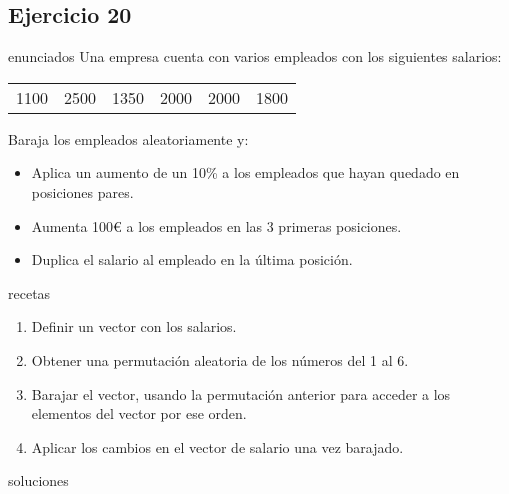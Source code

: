 \subsection{Ejercicio 20}
\def\parte{enunciados}
\ifx\capitulo\parte
Una empresa cuenta con varios empleados con los siguientes salarios:
\begin{center}
  \begin{tabular}[h]{cccccc}
    1100&2500&1350&2000&2000&1800
  \end{tabular}
\end{center}

Baraja los empleados aleatoriamente y:
\begin{itemize}
\item Aplica un aumento de un 10\% a los empleados que hayan quedado en posiciones pares.
\item Aumenta 100€ a los empleados en las 3 primeras posiciones.
\item Duplica el salario al empleado en la última posición.
\end{itemize}
\fi

\def\parte{recetas}
\ifx\capitulo\parte
\begin{enumerate}
\item Definir un vector con los salarios.
\item Obtener una permutación aleatoria de los números del 1 al 6.
\item Barajar el vector, usando la permutación anterior para acceder a los elementos del vector por ese orden.
\item Aplicar los cambios en el vector de salario una vez barajado.
\end{enumerate}
\fi

\def\parte{soluciones}
\ifx\capitulo\parte

\fi
